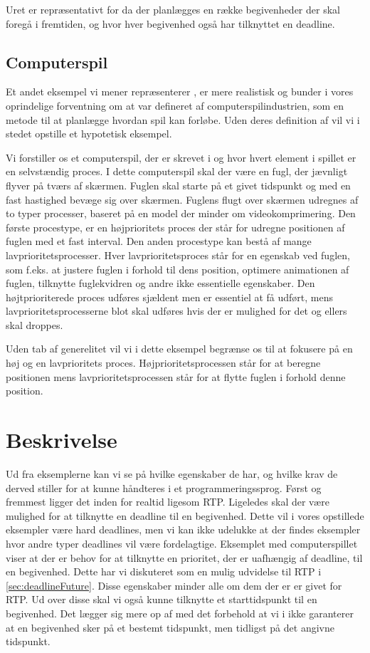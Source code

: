 Uret er repræsentativt for \is da der planlægges en række begivenheder der skal foregå i fremtiden, og hvor hver begivenhed også har tilknyttet en deadline.

\subsection{Computerspil}
Et andet eksempel vi mener repræsenterer  \is, er mere realistisk og bunder i vores oprindelige forventning om at \is  var defineret af computerspilindustrien, som en metode til at planlægge hvordan spil kan forløbe. Uden deres definition af \is vil vi i stedet opstille et hypotetisk eksempel. 

Vi forstiller os et computerspil, der er skrevet i \pycsp og hvor hvert element i spillet er en selvstændig proces. I dette computerspil skal der være en fugl, der jævnligt flyver på tværs af skærmen. Fuglen skal starte på et givet tidspunkt og med en fast hastighed bevæge sig over skærmen. Fuglens flugt over skærmen udregnes af to typer processer, baseret på en model der minder om videokomprimering. Den første procestype, er en højprioritets proces der står for udregne positionen af fuglen med  et fast interval. Den anden procestype kan bestå af mange lavprioritetsprocesser. Hver lavprioritetsproces står for en egenskab ved fuglen, som  f.eks. at justere fuglen i forhold til dens position, optimere animationen af fuglen, tilknytte fuglekvidren og andre ikke essentielle egenskaber. Den højtprioriterede proces udføres sjældent men er essentiel at få udført, mens lavprioritetsprocesserne blot skal udføres hvis der er mulighed for det og ellers skal droppes.

Uden tab af generelitet vil vi i dette eksempel begrænse os til at fokusere på en høj og en lavprioritets proces. Højprioritetsprocessen står for at beregne positionen mens lavprioritetsprocessen står for at flytte fuglen i forhold denne position.

\section{Beskrivelse}
Ud fra eksemplerne kan vi se på hvilke egenskaber de har, og hvilke krav de derved stiller for at kunne håndteres i et programmeringssprog. Først og fremmest ligger det inden for realtid ligesom RTP. Ligeledes skal der være mulighed for at tilknytte en deadline til en begivenhed. Dette vil i vores opstillede eksempler være hard deadlines, men vi kan ikke udelukke at der findes eksempler hvor andre typer deadlines vil være fordelagtige. Eksemplet med computerspillet viser at der er behov for at tilknytte en prioritet, der er uafhængig af deadline, til en begivenhed. Dette har vi diskuteret som en mulig udvidelse til RTP i \cref{sec:deadlineFuture}. Disse egenskaber minder alle om dem der er er givet for RTP. Ud over disse skal vi også kunne tilknytte et starttidspunkt til en begivenhed. Det lægger sig mere op af \des med det forbehold at vi i \is ikke garanterer at en begivenhed sker på et bestemt tidspunkt, men tidligst på det angivne tidspunkt.  

